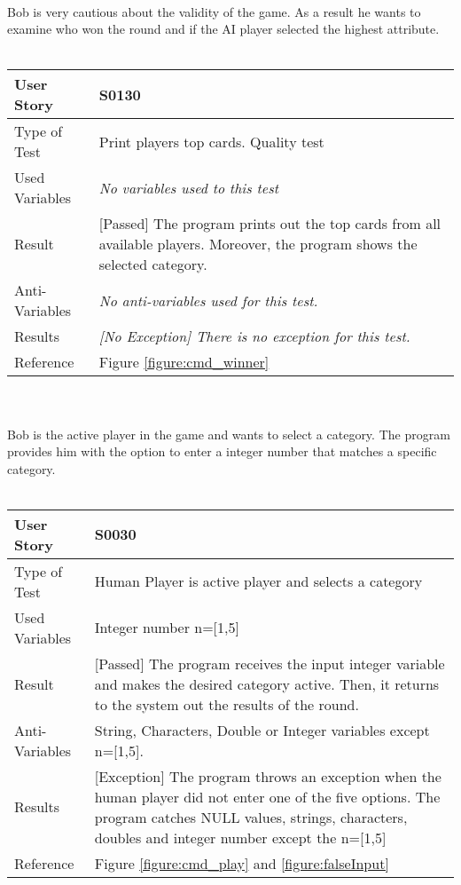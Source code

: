 \vspace{0.2cm}\\
Bob is very cautious about the validity of the game. As a result he wants to examine who won the round and if the AI player selected the highest attribute.\\
\vspace{0.2cm}\\
\begin{tabular}{l | p{12cm}}
User Story & \textbf{S0130} \\ \hline
Type of Test & Print players top cards. Quality test \\ \hline
Used Variables & \textit{No variables used to this test}\\ \hline
Result & [Passed] The program prints out the top cards from all available players. Moreover, the program shows the selected category.\\ \hline
Anti-Variables & \textit{No anti-variables used for this test.}\\ \hline
Results & \textit{[No Exception] There is no exception for this test.}\\ \hline
Reference & Figure \ref{figure:cmd_winner} \\ \hline
\end{tabular}\\
\vspace{0.2cm}\\
Bob is the active player in the game and wants to select a category. The program provides him with the option to enter a integer number that matches a specific category.\\
\vspace{0.2cm}\\
\begin{tabular}{l | p{12cm}}
User Story & \textbf{S0030}\\ \hline
Type of Test & Human Player is active player and selects a category\\ \hline
Used Variables & Integer number n=[1,5]\\ \hline
Result & [Passed] The program receives the input integer variable and makes the desired category active. Then, it returns to the system out the results of the round.\\ \hline
Anti-Variables & String, Characters, Double or Integer variables except n=[1,5].\\ \hline
Results & [Exception] The program throws an exception when the human player did not enter one of the five options. The program catches NULL values, strings, characters, doubles and integer number except the n=[1,5]\\ \hline
Reference & Figure \ref{figure:cmd_play} and \ref{figure:falseInput} \\ \hline
\end{tabular}\\
